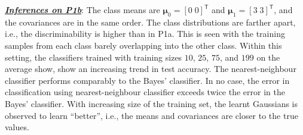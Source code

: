 \documentclass[12pt, a4 paper]{article}
\newcommand{\TT}{\mathsf{T}}
\newcommand{\bmu}{\boldsymbol{\mu}}
\begin{document}
\underline {\it \bfseries Inferences on P1b}: The class means are $\bmu_{0} = [0 \; 0]^{\TT}$ and $\bmu_{1} = [3 \; 3]^{\TT}$, and the covariances are in the same order. The class distributions are farther apart, i.e., the discriminability is higher than in P1a. This is seen with the training samples from each class barely overlapping into the other class. Within this setting, the classifiers trained with training sizes $10$, $25$, $75$, and $199$ on the average show, show an increasing trend in test accuracy. The nearest-neighbour classifier performs comparably to the Bayes' classifier. In no case, the error in classification using nearest-neighbour classifier exceeds twice the error in the Bayes' classifier. With increasing size of the training set, the learnt Gaussians is observed to learn ``better'', i.e., the means and covariances are closer to the true values. \\
\end{document}
